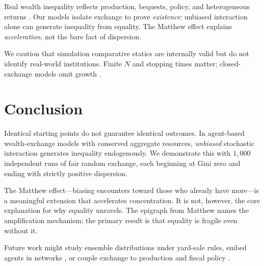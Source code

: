 \documentclass[12pt,a4paper]{article}
\begin{document}
Real wealth inequality reflects production, bequests, policy, and heterogeneous returns \citep{piketty2014, benhabib2019, galor2000}.
Our models isolate exchange to prove \emph{existence}: unbiased interaction alone can generate inequality from equality.
The Matthew effect explains \emph{acceleration}, not the bare fact of dispersion.

We caution that simulation comparative statics are internally valid but do not identify real-world institutions.
Finite $N$ and stopping times matter; closed-exchange models omit growth \citep{benhabib2011, acemoglu2015}.

\section{Conclusion}
\label{sec:conclusion}

Identical starting points do not guarantee identical outcomes.
In agent-based wealth-exchange models with conserved aggregate resources, \emph{unbiased} stochastic interaction generates inequality endogenously.
We demonstrate this with $1{,}000$ independent runs of fair random exchange, each beginning at Gini zero and ending with strictly positive dispersion.

The Matthew effect---biasing encounters toward those who already have more---is a meaningful extension that accelerates concentration.
It is not, however, the core explanation for why equality unravels.
The epigraph from Matthew names the amplification mechanism; the primary result is that equality is fragile even without it.

Future work might study ensemble distributions under yard-sale rules, embed agents in networks \citep{dieter2021}, or couple exchange to production and fiscal policy \citep{benhabib2011, piketty2014}.



\end{document}
